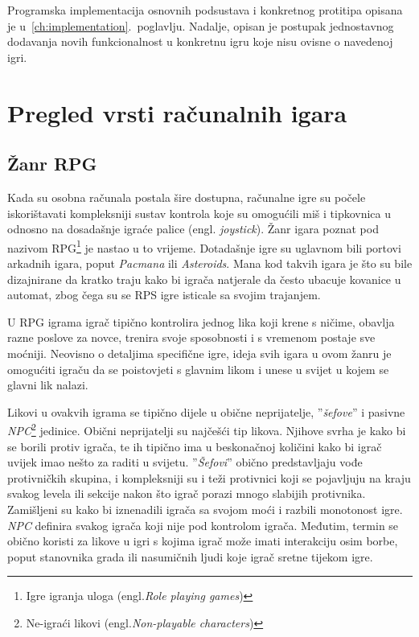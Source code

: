 \documentclass[times, utf8, zavrsni, numeric]{fer}
\begin{document}
\par Programska implementacija osnovnih podsustava i konkretnog protitipa opisana je u~\ref{ch:implementation}.~poglavlju.
Nadalje, opisan je postupak jednostavnog dodavanja novih funkcionalnost u konkretnu igru koje nisu ovisne o navedenoj igri.

\chapter{Pregled vrsti računalnih igara}\label{ch:games}


\section{Žanr RPG}

\par Kada su osobna računala postala šire dostupna, računalne igre su počele iskorištavati kompleksniji sustav kontrola koje su omogućili miš i tipkovnica u odnosno na dosadašnje igraće palice (engl. \textit{joystick}).
Žanr igara poznat pod nazivom RPG\footnote{Igre igranja uloga (engl.\textit{Role playing games})} je nastao u to vrijeme.
Dotadašnje igre su uglavnom bili portovi arkadnih igara, poput \textit{Pacmana} ili \textit{Asteroids}.
Mana kod takvih igara je što su bile dizajnirane da kratko traju kako bi igrača natjerale da često ubacuje kovanice u automat, zbog čega su se RPS igre isticale sa svojim trajanjem.

\par U RPG igrama igrač tipično kontrolira jednog lika koji krene s ničime, obavlja razne poslove za novce, trenira svoje sposobnosti i s vremenom postaje sve moćniji. 
Neovisno o detaljima specifične igre, ideja svih igara u ovom žanru je omogućiti igraču da se poistovjeti s glavnim likom i unese u svijet u kojem se glavni lik nalazi.

\par Likovi u ovakvih igrama se tipično dijele u obične neprijatelje, ''\textit{šefove}'' i pasivne \textit{NPC}\footnote{Ne-igraći likovi (engl.\textit{Non-playable characters})} jedinice.
Obični neprijatelji su najčešći tip likova.
Njihove svrha je kako bi se borili protiv igrača, te ih tipično ima u beskonačnoj količini kako bi igrač uvijek imao nešto za raditi u svijetu.
''\textit{Šefovi}'' obično predstavljaju vođe protivničkih skupina, i kompleksniji su i teži protivnici koji se pojavljuju na kraju svakog levela ili sekcije nakon što igrač porazi mnogo slabijih protivnika.
Zamišljeni su kako bi iznenadili igrača sa svojom moći i razbili monotonost igre.
\textit{NPC} definira svakog igrača koji nije pod kontrolom igrača. Međutim, termin se obično koristi za likove u igri s kojima igrač može imati interakciju osim borbe, poput stanovnika grada ili nasumičnih ljudi koje igrač sretne tijekom igre.
\end{document}
